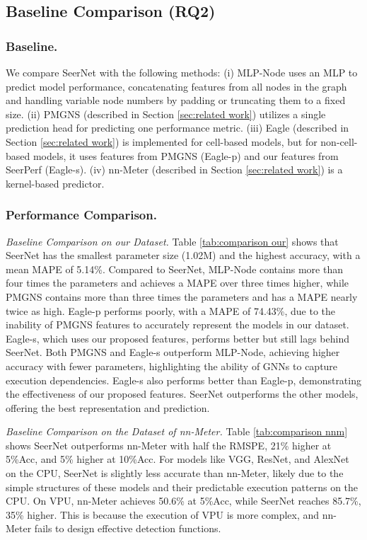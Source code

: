 


\subsection{Baseline Comparison (RQ2)}\label{sec:seernet compare}
\subsubsection{Baseline.} 
We compare SeerNet with the following methods:
(i) MLP-Node uses an MLP to predict model performance, concatenating features from all nodes in the graph and handling variable node numbers by padding or truncating them to a fixed size.
(ii) PMGNS \cite{DIPPM} (described in Section \ref{sec:related work}) utilizes a single prediction head for predicting one performance metric.
(iii) Eagle \cite{Brp-nas} (described in Section \ref{sec:related work}) is implemented for cell-based models, but for non-cell-based models, it uses features from PMGNS (Eagle-p) and our features from SeerPerf (Eagle-s).
(iv) nn-Meter \cite{Nn-meter} (described in Section \ref{sec:related work}) is a kernel-based predictor.

\subsubsection{Performance Comparison.}
\emph{Baseline Comparison on our Dataset.}
Table \ref{tab:comparison our} shows that SeerNet has the smallest parameter size (1.02M) and the highest accuracy, with a mean MAPE of 5.14\%.
Compared to SeerNet,
MLP-Node contains more than four times the parameters and achieves a MAPE over three times higher, while PMGNS contains more than three times the parameters and has a MAPE nearly twice as high.
Eagle-p performs poorly, with a MAPE of 74.43\%, due to the inability of PMGNS features to accurately represent the models in our dataset.
Eagle-s, which uses our proposed features, performs better but still lags behind SeerNet.
Both PMGNS and Eagle-s outperform MLP-Node, achieving higher accuracy with fewer parameters, highlighting the ability of GNNs to capture execution dependencies.
Eagle-s also performs better than Eagle-p, demonstrating the effectiveness of our proposed features. SeerNet outperforms the other models, offering the best representation and prediction.

\emph{Baseline Comparison on the Dataset of nn-Meter.} %
Table \ref{tab:comparison nnm} shows SeerNet outperforms nn-Meter with half the RMSPE, 21\% higher at 5\%Acc, and 5\% higher at 10\%Acc.
For models like VGG, ResNet, and AlexNet on the CPU, SeerNet is slightly less accurate than nn-Meter, likely due to the simple structures of these models and their predictable execution patterns on the CPU.
On VPU, nn-Meter achieves 50.6\% at 5\%Acc, while SeerNet reaches 85.7\%, 35\% higher. 
This is because the execution of VPU is more complex, and nn-Meter fails to design effective detection functions. 

